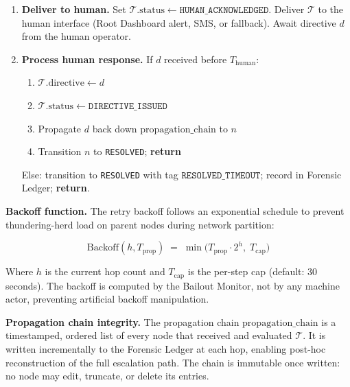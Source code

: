 \begin{algorithm}[H]
\begin{enumerate}
\item \label{step:deliver}\textbf{Deliver to human.} Set
  $\mathcal{T}.\text{status} \leftarrow \texttt{HUMAN\_ACKNOWLEDGED}$.
  Deliver $\mathcal{T}$ to the human interface (Root Dashboard alert,
  SMS, or fallback). Await directive $d$ from the human operator.

\item \textbf{Process human response.} If $d$ received before
  $T_{\text{human}}$:
  \begin{enumerate}
  \item $\mathcal{T}.\text{directive} \leftarrow d$
  \item $\mathcal{T}.\text{status} \leftarrow \texttt{DIRECTIVE\_ISSUED}$
  \item Propagate $d$ back down $\text{propagation\_chain}$ to $n$
  \item Transition $n$ to \texttt{RESOLVED}; \textbf{return}
  \end{enumerate}
  Else: transition to \texttt{RESOLVED} with tag
  $\texttt{RESOLVED\_TIMEOUT}$; record in Forensic Ledger; \textbf{return}.
\end{enumerate}
\end{algorithm}

\bigskip
\noindent\textbf{Backoff function.} The retry backoff follows an exponential
schedule to prevent thundering-herd load on parent nodes during network
partition:

\begin{equation}
\text{Backoff}(h, T_{\text{prop}}) \;=\; \min\!\bigl(
  T_{\text{prop}} \cdot 2^{h},\;
  T_{\text{cap}}
\bigr)
\tag{eq:backoff}
\end{equation}

Where $h$ is the current hop count and $T_{\text{cap}}$ is the per-step
cap (default: 30 seconds). The backoff is computed by the Bailout Monitor,
not by any machine actor, preventing artificial backoff manipulation.

\bigskip
\noindent\textbf{Propagation chain integrity.} The propagation chain
$\text{propagation\_chain}$ is a timestamped, ordered list of every node
that received and evaluated $\mathcal{T}$. It is written incrementally to the
Forensic Ledger at each hop, enabling post-hoc reconstruction of the full
escalation path. The chain is immutable once written: no node may edit,
truncate, or delete its entries.


